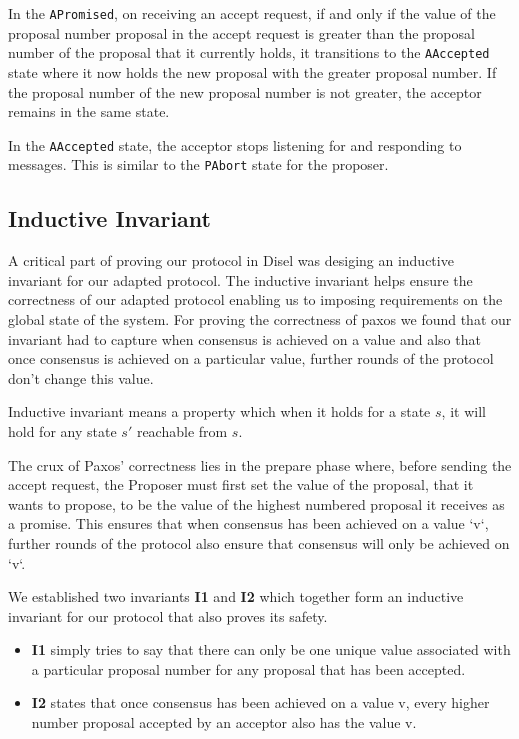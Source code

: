 In the \texttt{APromised}, on receiving an accept request, if and only if
the value of the proposal number proposal in the accept request is greater than
the proposal number of the proposal that it currently holds, it transitions to the
\texttt{AAccepted} state where it now holds the new proposal with the greater
proposal number. If the proposal number of the new proposal number is not greater,
the acceptor remains in the same state.

In the \texttt{AAccepted} state, the acceptor stops listening for and responding
to messages. This is similar to the \texttt{PAbort} state for the proposer.


\subsection{Inductive Invariant}
A critical part of proving our protocol in Disel was desiging an inductive invariant
for our adapted protocol. The inductive invariant helps ensure the correctness of
our adapted protocol enabling us to imposing requirements on the global state of the system.
For proving the correctness of paxos we found that our invariant had to capture
when consensus is achieved on a value and also that once consensus is achieved
on a particular value, further rounds of the protocol don’t change this value.

Inductive invariant means a property which when it holds for a state $s$,
it will hold for any state $s'$ reachable from $s$.

The crux of Paxos' correctness lies in the prepare phase where, before sending
the accept request, the Proposer must first set the value of the proposal, that
it wants to propose, to be the value of the highest numbered proposal it receives
as a promise. This ensures that when consensus has been achieved on a value `v`,
further rounds of the protocol also ensure that consensus will only be achieved on `v`.

We established two invariants \textbf{I1} and \textbf{I2} which together form an inductive
invariant for our protocol that also proves its safety.

\begin{itemize}
  \item \textbf{I1} simply tries to say that there can only be one unique value
    associated with a particular proposal number for any proposal that has been accepted.
  \item \textbf{I2} states that once consensus has been achieved on a value v,
    every higher number proposal accepted by an acceptor also has the value v.
\end{itemize}

